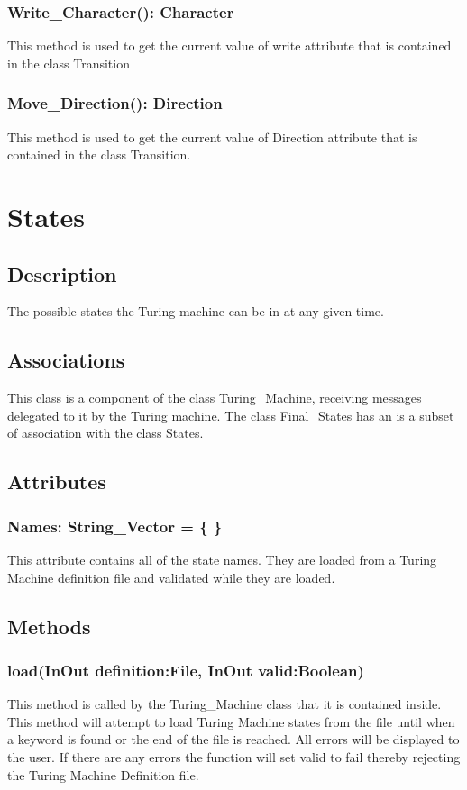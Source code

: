 \documentclass{report}
\begin{document}
    \subsubsection{Write\_Character(): Character}
	This method is used to get the current value of write attribute that is contained in the class Transition
	\subsubsection{Move\_Direction(): Direction}
    This method is used to get the current value of Direction attribute that is contained in the class Transition.
    
    
\section{States}
	\subsection{Description}
    The possible states the Turing machine can be in at any given time.
    \subsection{Associations} 
     This class is a component of the class Turing\_Machine, receiving messages delegated to it by the Turing machine.
     The class Final\_States has an is a subset of association with the class States. 
    \subsection{Attributes} 
    \subsubsection{Names: String\_Vector =  \{ \}}
    This attribute contains all of the state names. They are loaded from a Turing Machine definition file and validated while they are loaded.
    
    \subsection{Methods} 
    
      \subsubsection{load(InOut definition:File, InOut valid:Boolean)}
      This method is called by the Turing\_Machine class that it is contained inside. This method will attempt to load Turing Machine states from the file until when a keyword is found or the end of the file is reached. All errors will be displayed to the user. If there are any errors the function will set valid to fail thereby rejecting the Turing Machine Definition file. 
      
\end{document}
